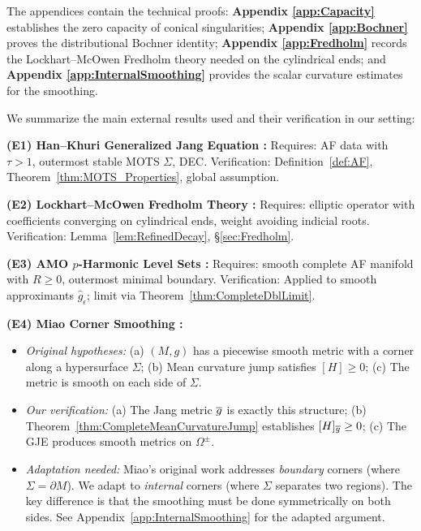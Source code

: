 The appendices contain the technical proofs: \textbf{Appendix \ref{app:Capacity}} establishes the zero capacity of conical singularities; \textbf{Appendix \ref{app:Bochner}} proves the distributional Bochner identity; \textbf{Appendix \ref{app:Fredholm}} records the Lockhart--McOwen Fredholm theory needed on the cylindrical ends; and \textbf{Appendix \ref{app:InternalSmoothing}} provides the scalar curvature estimates for the smoothing.

\begin{remark}\label{rem:ExternalHypotheses}
We summarize the main external results used and their verification in our setting:

\textbf{(E1) Han--Khuri Generalized Jang Equation \cite{hankhuri2013}:}
Requires: AF data with $\tau > 1$, outermost stable MOTS $\Sigma$, DEC.
Verification: Definition~\ref{def:AF}, Theorem~\ref{thm:MOTS_Properties}, global assumption.

\textbf{(E2) Lockhart--McOwen Fredholm Theory \cite{lockhartmccowen1985}:}
Requires: elliptic operator with coefficients converging on cylindrical ends, weight avoiding indicial roots.
Verification: Lemma~\ref{lem:RefinedDecay}, \S\ref{sec:Fredholm}.

\textbf{(E3) AMO $p$-Harmonic Level Sets \cite{amo2024}:}
Requires: smooth complete AF manifold with $R \ge 0$, outermost minimal boundary.
Verification: Applied to smooth approximants $\hat{g}_\epsilon$; limit via Theorem~\ref{thm:CompleteDblLimit}.
\end{remark}

\textbf{(E4) Miao Corner Smoothing \cite{miao2002}:}
\begin{itemize}
    \item \textit{Original hypotheses:} (a) $(M, g)$ has a piecewise smooth metric with a corner along a hypersurface $\Sigma$; (b) Mean curvature jump satisfies $[H] \ge 0$; (c) The metric is smooth on each side of $\Sigma$.
    \item \textit{Our verification:} (a) The Jang metric $\overline{g}$ is exactly this structure; (b) Theorem~\ref{thm:CompleteMeanCurvatureJump} establishes $[H]_{\overline{g}} \ge 0$; (c) The GJE produces smooth metrics on $\Omega^\pm$.
    \item \textit{Adaptation needed:} Miao's original work addresses \emph{boundary} corners (where $\Sigma = \partial M$). We adapt to \emph{internal} corners (where $\Sigma$ separates two regions). The key difference is that the smoothing must be done symmetrically on both sides. See Appendix~\ref{app:InternalSmoothing} for the adapted argument.
\end{itemize}

